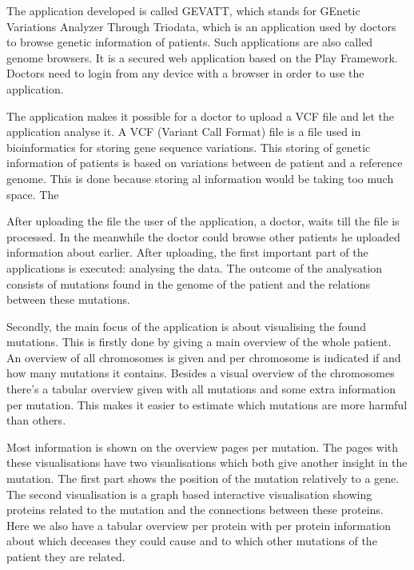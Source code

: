 The application developed is called GEVATT, which stands for GEnetic Variations Analyzer Through Triodata, which is an application used by doctors to browse genetic information of patients. Such applications are also called genome browsers. It is a secured web application based on the Play Framework. Doctors need to login from any device with a browser in order to use the application.

The application makes it possible for a doctor to upload a VCF file and let the application analyse it. A VCF (Variant Call Format) file is a file used in bioinformatics for storing gene sequence variations. This storing of genetic information of patients is based on variations between de patient and a reference genome. This is done because storing al information would be taking too much space. The 

After uploading the file the user of the application, a doctor, waits till the file is processed. In the meanwhile the doctor could browse other patients he uploaded information about earlier. After uploading, the first important part of the applications is executed: analysing the data. The outcome of the analysation consists of mutations found in the genome of the patient and the relations between these mutations.

Secondly, the main focus of the application is about visualising the found mutations. This is firstly done by giving a main overview of the whole patient. An overview of all chromosomes is given and per chromosome is indicated if and how many mutations it contains. Besides a visual overview of the chromosomes there's a tabular overview given with all mutations and some extra information per mutation. This makes it easier to estimate which mutations are more harmful than others.

Most information is shown on the overview pages per mutation. The pages with these visualisations have two visualisations which both give another insight in the mutation. The first part shows the position of the mutation relatively to a gene. The second visualisation is a graph based interactive visualisation showing proteins related to the mutation and the connections between these proteins. Here we also have a tabular overview per protein with per protein information about which deceases they could cause and to which other mutations of the patient they are related.